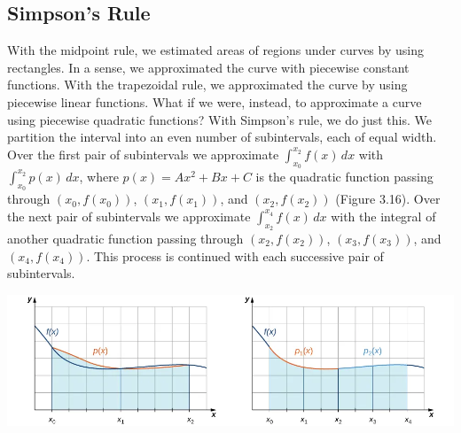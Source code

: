 \documentclass{report}
\begin{document}
        \subsection*{Simpson’s Rule}
        \bigbreak \noindent 
        With the midpoint rule, we estimated areas of regions under curves by using rectangles. In a sense, we approximated the curve with piecewise constant functions. With the trapezoidal rule, we approximated the curve by using piecewise linear functions. What if we were, instead, to approximate a curve using piecewise quadratic functions? With Simpson’s rule, we do just this. We partition the interval into an even number of subintervals, each
        of equal width. Over the first pair of subintervals we approximate $\int_{x_0}^{x_2} f(x) \, dx$ with $\int_{x_0}^{x_2} p(x) \, dx$, where $p(x) = Ax^2 + Bx + C$ is the quadratic function passing through $(x_0, f(x_0))$, $(x_1, f(x_1))$, and $(x_2, f(x_2))$ (Figure 3.16). Over the next pair of subintervals we approximate $\int_{x_2}^{x_4} f(x) \, dx$ with the integral of another quadratic function passing through $(x_2, f(x_2))$, $(x_3, f(x_3))$, and $(x_4, f(x_4))$. This process is continued with each successive pair of subintervals.
        \bigbreak \noindent 
        \begin{center}
            \includegraphics[scale=0.5]{./figures/mane1.png}
        \end{center}
\end{document}
